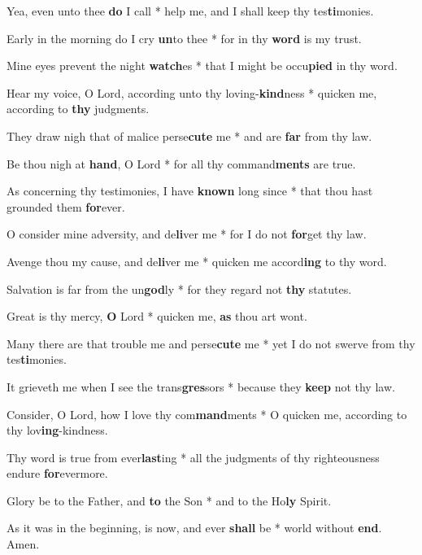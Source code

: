 \begin{multicols}{2}
	Yea, even unto thee \textbf{do} I call * help me, and I shall keep thy tes\textbf{ti}monies.
	
	Early in the morning do I cry \textbf{un}to thee * for in thy \textbf{word} is my trust.
	
	Mine eyes prevent the night \textbf{watch}es * that I might be occu\textbf{pied} in thy word.
	
	Hear my voice, O Lord, according unto thy loving-\textbf{kind}ness * quicken me, according to \textbf{thy} judgments.
	
	They draw nigh that of malice perse\textbf{cute} me * and are \textbf{far} from thy law.
	
	Be thou nigh at \textbf{hand}, O Lord * for all thy command\textbf{ments} are true.
	
	As concerning thy testimonies, I have \textbf{known} long since * that thou hast grounded them \textbf{for}ever.
	
	O consider mine adversity, and de\textbf{li}ver me * for I do not \textbf{for}get thy law.
	
	Avenge thou my cause, and de\textbf{li}ver me * quicken me accord\textbf{ing} to thy word.
	
	Salvation is far from the un\textbf{god}ly * for they regard not \textbf{thy} statutes.
	
	Great is thy mercy, \textbf{O} Lord * quicken me, \textbf{as} thou art wont.
	
	Many there are that trouble me and perse\textbf{cute} me * yet I do not swerve from thy tes\textbf{ti}monies.
	
	It grieveth me when I see the trans\textbf{gres}sors * because they \textbf{keep} not thy law.
	
	Consider, O Lord, how I love thy com\textbf{mand}ments * O quicken me, according to thy lov\textbf{ing}-kindness.
	
	Thy word is true from ever\textbf{last}ing * all the judgments of thy righteousness endure \textbf{for}evermore.
	
	Glory be to the Father, and \textbf{to} the Son * and to the Ho\textbf{ly} Spirit.
	
	As it was in the beginning, is now, and ever \textbf{shall} be * world without \textbf{end}. Amen.
\end{multicols}